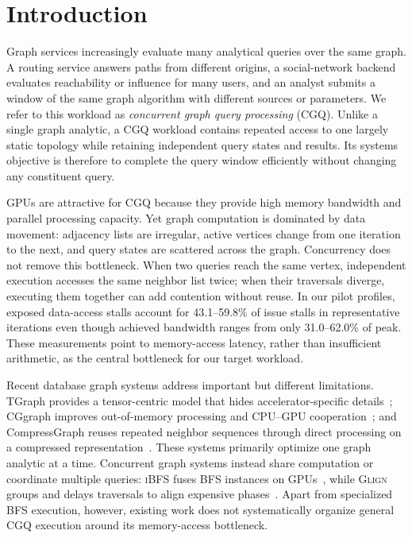 \section{Introduction}

Graph services increasingly evaluate many analytical queries over the same graph.  A routing service answers paths from different origins, a social-network backend evaluates reachability or influence for many users, and an analyst submits a window of the same graph algorithm with different sources or parameters.  We refer to this workload as \emph{concurrent graph query processing} (CGQ).  Unlike a single graph analytic, a CGQ workload contains repeated access to one largely static topology while retaining independent query states and results.  Its systems objective is therefore to complete the query window efficiently without changing any constituent query.

GPUs are attractive for CGQ because they provide high memory bandwidth and parallel processing capacity.  Yet graph computation is dominated by data movement: adjacency lists are irregular, active vertices change from one iteration to the next, and query states are scattered across the graph.  Concurrency does not remove this bottleneck.  When two queries reach the same vertex, independent execution accesses the same neighbor list twice; when their traversals diverge, executing them together can add contention without reuse.  In our pilot profiles, exposed data-access stalls account for 43.1--59.8\% of issue stalls in representative iterations even though achieved bandwidth ranges from only 31.0--62.0\% of peak.  These measurements point to memory-access latency, rather than insufficient arithmetic, as the central bottleneck for our target workload.

Recent database graph systems address important but different limitations.  TGraph provides a tensor-centric model that hides accelerator-specific details~\cite{zhang_tgraph_2025}; CGgraph improves out-of-memory processing and CPU--GPU cooperation~\cite{cui_cggraph_2024}; and CompressGraph reuses repeated neighbor sequences through direct processing on a compressed representation~\cite{chen_compressgraph_2023}.  These systems primarily optimize one graph analytic at a time.  Concurrent graph systems instead share computation or coordinate multiple queries: \textsc{iBFS} fuses BFS instances on GPUs~\cite{liu_ibfs_2016}, while \textsc{Glign} groups and delays traversals to align expensive phases~\cite{yin_glign_2022}.  Apart from specialized BFS execution, however, existing work does not systematically organize general CGQ execution around its memory-access bottleneck.

